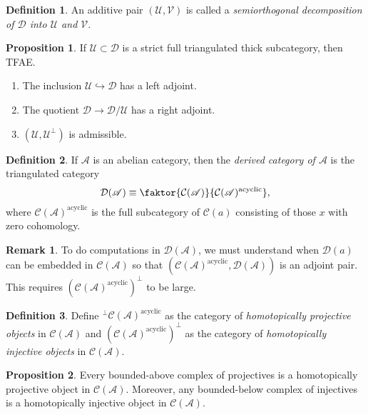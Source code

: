 \documentclass[10pt,letterpaper,cm]{nupset}
\theoremstyle{definition}
\newtheorem*{definition}{Definition}
\newtheorem{remark}{Remark}
\newtheorem{prop}{Proposition}
\newcommand{\D}{\mathcal{D}}
\newcommand{\1}{\mathbf{1}}
\renewcommand{\a}{\mathscr{A}}
\renewcommand{\d}{\mathscr{D}}
\renewcommand{\u}{\mathscr{U}}
\renewcommand{\v}{\mathscr{V}}
\newcommand{\0}{\vec 0}
\DeclareMathOperator{\acyc}{acyclic}
\begin{document}
\begin{definition}
An additive pair $(\u, \v)$ is called a \textit{semiorthogonal decomposition of $\d$ into $\u$ and $\v$}.
\end{definition}

\begin{prop}
If $\u \subset \d$ is a strict full triangulated thick subcategory, then TFAE.
\begin{enumerate}
\item The inclusion $\u \hookrightarrow \d$ has a left adjoint.
\item The quotient $\d \to \d/\u$ has a right adjoint.
\item $(\u, \u^{\perp})$ is admissible. 
\end{enumerate}
\end{prop}

\begin{definition}
If $\a$ is an abelian category, then the \textit{derived category of $\a$} is the triangulated category $$ \D(\a) \equiv \faktor{\mathcal{C}(\a)}{\mathcal{C}(\a)^{\acyc}}  , $$ where $\mathcal{C}(\a)^{\acyc}$ is the full subcategory of $\mathcal{C}(a)$ consisting of those $x$ with zero cohomology. 
\end{definition}

\begin{remark}
To do computations in $\D(\a)$, we must understand when $\D(a)$ can be embedded in $\mathcal{C}(\a)$ so that $(\mathcal{C}(\a)^{\acyc}, \D(\a))$ is an adjoint pair. This requires $(\mathcal{C}(\a)^{\acyc})^{\perp}$  to be large. 
\end{remark}

\begin{definition}
Define ${^{\perp}{\mathcal{C}(\a)^{\acyc}}}$ as the category of \textit{homotopically projective objects} in $\mathcal{C}(\a)$ and $(\mathcal{C}(\a)^{\acyc})^{\perp}$ as the category of \textit{homotopically injective objects} in $\mathcal{C}(\a)$. 
\end{definition}

\begin{prop}
Every bounded-above complex of projectives is a homotopically projective object in $\mathcal{C}(\a)$. Moreover, any bounded-below complex of injectives is a homotopically injective object in $\mathcal{C}(\a)$. 
\end{prop}
\end{document}
